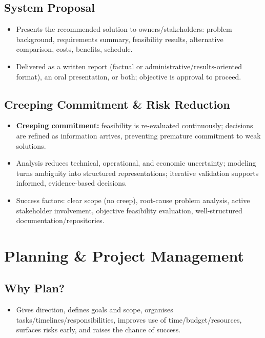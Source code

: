 \documentclass[hidelinks]{article}
\begin{document}
\subsection{System Proposal}
\begin{itemize}
  \item Presents the recommended solution to owners/stakeholders: problem background,
        requirements summary, feasibility results, alternative comparison, costs, benefits, schedule.
  \item Delivered as a written report (factual or administrative/results-oriented format), an oral
        presentation, or both; objective is approval to proceed.
\end{itemize}

\subsection{Creeping Commitment \& Risk Reduction}
\begin{itemize}
  \item \textbf{Creeping commitment:} feasibility is re-evaluated continuously; decisions are
        refined as information arrives, preventing premature commitment to weak solutions.
  \item Analysis reduces technical, operational, and economic uncertainty; modeling turns
        ambiguity into structured representations; iterative validation supports informed,
        evidence-based decisions.
  \item Success factors: clear scope (no creep), root-cause problem analysis, active stakeholder
        involvement, objective feasibility evaluation, well-structured documentation/repositories.
\end{itemize}

\section{Planning \& Project Management}

\subsection{Why Plan?}
\begin{itemize}
  \item Gives direction, defines goals and scope, organises tasks/timelines/responsibilities,
        improves use of time/budget/resources, surfaces risks early, and raises the chance of success.
\end{itemize}
\end{document}
